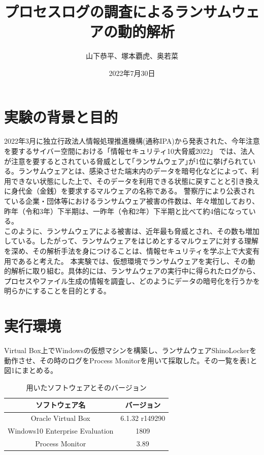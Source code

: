 \documentclass[dvipdfmx,autodetect-engine]{jsarticle}
\title{プロセスログの調査によるランサムウェアの動的解析}
\author{山下恭平、塚本覇虎、奥若菜}
\date{2022年7月30日}
\begin{document}
 
 \maketitle

\section{実験の背景と目的}
2022年3月に独立行政法人情報処理推進機構(通称IPA)から発表された、今年注意を要するサイバー空間における「情報セキュリティ10大脅威2022」
では、法人が注意を要するとされている脅威として｢ランサムウェア｣が1位に挙げられている。ランサムウェアとは、感染させた端末内のデータを暗号化などによって、利用できない状態にした上で、そのデータを利用できる状態に戻すことと引き換えに身代金（金銭）を要求するマルウェアの名称である。
警察庁により公表されている企業・団体等におけるランサムウェア被害の件数は、年々増加しており、昨年（令和3年）下半期は、一昨年（令和2年）下半期と比べて約4倍になっている。\\
このように、ランサムウェアによる被害は、近年最も脅威とされ、その数も増加している。したがって、ランサムウェアをはじめとするマルウェアに対する理解を深め、その解析手法を身につけることは、情報セキュリティを学ぶ上で大変有用であると考えた。
本実験では、仮想環境でランサムウェアを実行し、その動的解析に取り組む。具体的には、ランサムウェアの実行中に得られたログから、プロセスやファイル生成の情報を調査し、どのようにデータの暗号化を行うかを明らかにすることを目的とする。
\section{実行環境}

Virtual Box上でWindowsの仮想マシンを構築し、ランサムウェアShinoLockerを
動作させ、その時のログをProcess Monitorを用いて採取した。その一覧を表1と図1にまとめる。

\begin{table}[H]
  \centering
  \caption{用いたソフトウェアとそのバージョン}
  \begin{tabular}{|c|c|}
  \hline
  ソフトウェア名                         & バージョン          \\ \hline
  Oracle Virtual Box              & 6.1.32 r149290 \\ \hline
  Windows10 Enterprise Evaluation & 1809           \\ \hline
  Process Monitor                 & 3.89           \\ \hline
  \end{tabular}
  \end{table}
\end{document}
